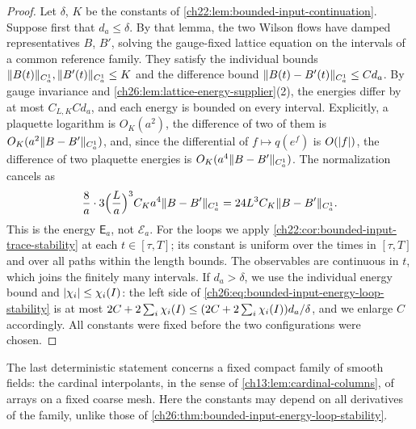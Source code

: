 \begin{proof}
Let $\delta$, $K$ be the constants of \cref{ch22:lem:bounded-input-continuation}. Suppose first that $d_a\le\delta$. By that lemma, the two Wilson flows have damped representatives $B$, $B'$, solving the gauge-fixed lattice equation on the intervals of a common reference family. They satisfy the individual bounds $\lVert B(t)\rVert_{C_a^1},\lVert B'(t)\rVert_{C_a^1}\le K$ and the difference bound $\lVert B(t)-B'(t)\rVert_{C_a^1}\le Cd_a$. By gauge invariance and \cref{ch26:lem:lattice-energy-supplier}(2), the energies differ by at most $C_{L,K}Cd_a$, and each energy is bounded on every interval. Explicitly, a plaquette logarithm is $O_K(a^2)$, the difference of two of them is $O_K(a^2\lVert B-B'\rVert_{C_a^1})$, and, since the differential of $f\mapsto q(e^f)$ is $O(\lvert f\rvert)$, the difference of two plaquette energies is $O_K(a^4\lVert B-B'\rVert_{C_a^1})$. The normalization cancels as
\[
 \frac8a\cdot3\Bigl(\frac La\Bigr)^3C_Ka^4\lVert B-B'\rVert_{C_a^1}=24L^3C_K\lVert B-B'\rVert_{C_a^1}.
\]
This is the energy $\mathsf E_a$, not $\mathcal E_a$. For the loops we apply \cref{ch22:cor:bounded-input-trace-stability} at each $t\in[\tau,T]$; its constant is uniform over the times in $[\tau,T]$ and over all paths within the length bounds.  The observables are continuous in $t$, which joins the finitely many intervals. If $d_a>\delta$, we use the individual energy bound and $\lvert \chi_i\rvert\le\chi_i(I)$: the left side of \eqref{ch26:eq:bounded-input-energy-loop-stability} is at most $2C+2\sum_i\chi_i(I)\le(2C+2\sum_i\chi_i(I))d_a/\delta$, and we enlarge $C$ accordingly. All constants were fixed before the two configurations were chosen.
\end{proof}

The last deterministic statement concerns a fixed compact family of smooth fields: the cardinal interpolants, in the sense of \cref{ch13:lem:cardinal-columns}, of arrays on a fixed coarse mesh. Here the constants may depend on all derivatives of the family, unlike those of \cref{ch26:thm:bounded-input-energy-loop-stability}.

